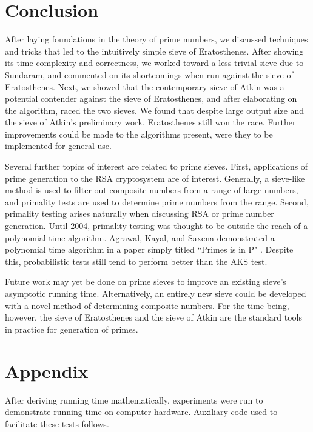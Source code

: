\documentclass{amsart}
\theoremstyle{definition}
\theoremstyle{case}
\begin{document}
	\section{Conclusion}
	
	After laying foundations in the theory of prime numbers, we discussed techniques and tricks that led to the intuitively simple sieve of Eratosthenes. After showing its time complexity and correctness, we worked toward a less trivial sieve due to Sundaram, and commented on its shortcomings when run against the sieve of Eratosthenes. Next, we showed that the contemporary sieve of Atkin was a potential contender against the sieve of Eratosthenes, and after elaborating on the algorithm, raced the two sieves. We found that despite large output size and the sieve of Atkin's preliminary work, Eratosthenes still won the race. Further improvements could be made to the algorithms present, were they to be implemented for general use. 
	
	Several further topics of interest are related to prime sieves. First, applications of prime generation to the RSA cryptosystem are of interest. Generally, a sieve-like method is used to filter out composite numbers from a range of large numbers, and primality tests are used to determine prime numbers from the range. Second, primality testing arises naturally when discussing RSA or prime number generation. Until 2004, primality testing was thought to be outside the reach of a polynomial time algorithm. Agrawal, Kayal, and Saxena demonstrated a polynomial time algorithm in a paper simply titled ``Primes is in P" \cite{MR2123939}. Despite this, probabilistic tests still tend to perform better than the AKS test.
	
	Future work may yet be done on prime sieves to improve an existing sieve's asymptotic running time. Alternatively, an entirely new sieve could be developed with a novel method of determining composite numbers. For the time being, however, the sieve of Eratosthenes and the sieve of Atkin are the standard tools in practice for generation of primes.
	

	\section*{Appendix}
	
	After deriving running time mathematically, experiments were run to demonstrate running time on computer hardware. Auxiliary code used to facilitate these tests follows.
	
	

	
	
\end{document}
